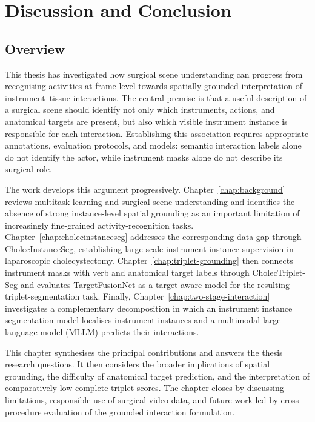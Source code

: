 \chapter{Discussion and Conclusion}
\label{chap:discussion-conclusion}
\setcounter{minitocdepth}{1}
\minitoc
\setcounter{minitocdepth}{2}

\section{Overview}
\label{sec:discussion-overview}

This thesis has investigated how surgical scene understanding can progress from recognising activities at frame level towards spatially grounded interpretation of instrument--tissue interactions. The central premise is that a useful description of a surgical scene should identify not only which instruments, actions, and anatomical targets are present, but also which visible instrument instance is responsible for each interaction. Establishing this association requires appropriate annotations, evaluation protocols, and models: semantic interaction labels alone do not identify the actor, while instrument masks alone do not describe its surgical role.

The work develops this argument progressively. Chapter~\ref{chap:background} reviews multitask learning and surgical scene understanding and identifies the absence of strong instance-level spatial grounding as an important limitation of increasingly fine-grained activity-recognition tasks. Chapter~\ref{chap:cholecinstanceseg} addresses the corresponding data gap through CholecInstanceSeg, establishing large-scale instrument instance supervision in laparoscopic cholecystectomy. Chapter~\ref{chap:triplet-grounding} then connects instrument masks with verb and anatomical target labels through CholecTriplet-Seg and evaluates TargetFusionNet as a target-aware model for the resulting triplet-segmentation task. Finally, Chapter~\ref{chap:two-stage-interaction} investigates a complementary decomposition in which an instrument instance segmentation model localises instrument instances and a multimodal large language model (MLLM) predicts their interactions.

This chapter synthesises the principal contributions and answers the thesis research questions. It then considers the broader implications of spatial grounding, the difficulty of anatomical target prediction, and the interpretation of comparatively low complete-triplet scores. The chapter closes by discussing limitations, responsible use of surgical video data, and future work led by cross-procedure evaluation of the grounded interaction formulation.

